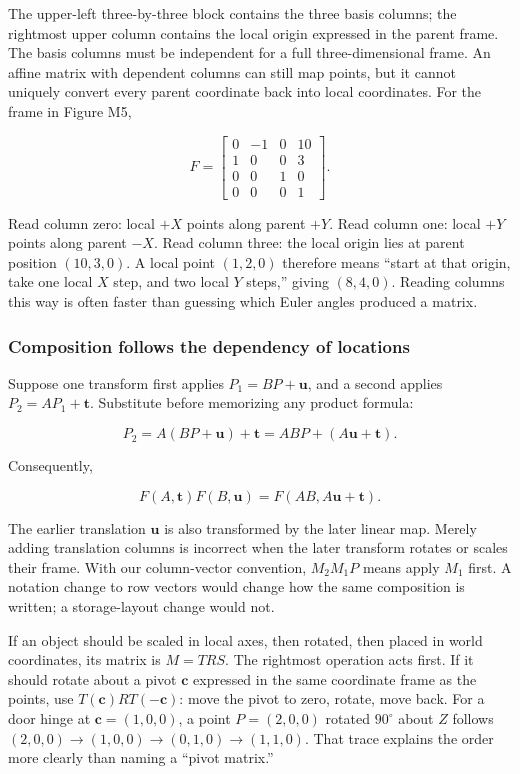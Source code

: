 The upper-left three-by-three block contains the three basis columns; the rightmost upper column contains the local origin expressed in the parent frame. The basis columns must be independent for a full three-dimensional frame. An affine matrix with dependent columns can still map points, but it cannot uniquely convert every parent coordinate back into local coordinates. For the frame in Figure M5,

\[
F=
\begin{bmatrix}
0&-1&0&10\\
1&0&0&3\\
0&0&1&0\\
0&0&0&1
\end{bmatrix}.
\]

Read column zero: local \(+X\) points along parent \(+Y\). Read column one: local \(+Y\) points along parent \(-X\). Read column three: the local origin lies at parent position \((10,3,0)\). A local point \((1,2,0)\) therefore means ``start at that origin, take one local \(X\) step, and two local \(Y\) steps,'' giving \((8,4,0)\). Reading columns this way is often faster than guessing which Euler angles produced a matrix.

\subsubsection{Composition follows the dependency of locations}\label{01-foundations-i-ch018-composition-follows-the-dependency-of-locations}

\hypertarget{01-foundations-i-ch018-composition-follows-the-dependency-of-locations}{}

Suppose one transform first applies \(P_1=BP+\mathbf u\), and a second applies \(P_2=AP_1+\mathbf t\). Substitute before memorizing any product formula:

\[
P_2=A(BP+\mathbf u)+\mathbf t
=ABP+(A\mathbf u+\mathbf t).
\]

Consequently,

\[
F(A,\mathbf t)F(B,\mathbf u)
=F(AB,A\mathbf u+\mathbf t).
\]

The earlier translation \(\mathbf u\) is also transformed by the later linear map. Merely adding translation columns is incorrect when the later transform rotates or scales their frame. With our column-vector convention, \(M_2M_1P\) means apply \(M_1\) first. A notation change to row vectors would change how the same composition is written; a storage-layout change would not.

If an object should be scaled in local axes, then rotated, then placed in world coordinates, its matrix is \(M=TRS\). The rightmost operation acts first. If it should rotate about a pivot \(\mathbf c\) expressed in the same coordinate frame as the points, use \(T(\mathbf c)RT(-\mathbf c)\): move the pivot to zero, rotate, move back. For a door hinge at \(\mathbf c=(1,0,0)\), a point \(P=(2,0,0)\) rotated \(90^\circ\) about \(Z\) follows \((2,0,0)\to(1,0,0)\to(0,1,0)\to(1,1,0)\). That trace explains the order more clearly than naming a ``pivot matrix.''

